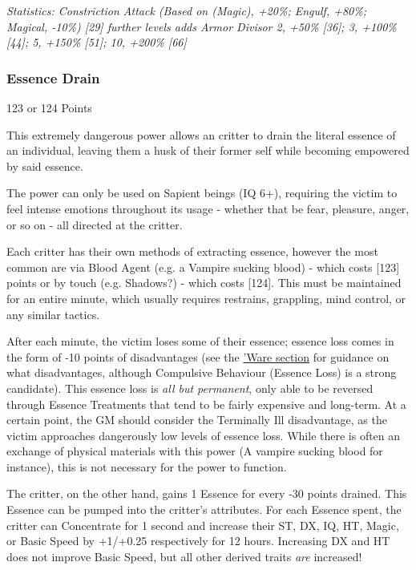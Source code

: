 \begin{multicols*}{3}
	\textcolor{OliveGreen}{\textit{Statistics: Constriction Attack (Based on (Magic), +20\%; Engulf, +80\%; Magical, -10\%) [29] further levels adds Armor Divisor 2, +50\% [36]; 3, +100\% [44]; 5, +150\% [51]; 10, +200\% [66]}}
	
	
	\subsubsection{Essence Drain}\label{essence_drain}
	\begin{flushright}
		123 or 124 Points
	\end{flushright}
		
	This extremely dangerous power allows an critter to drain the literal essence of an individual, leaving them a husk of their former self while becoming empowered by said essence.
	
	The power can only be used on Sapient beings (IQ 6+), requiring the victim to feel intense emotions throughout its usage - whether that be fear, pleasure, anger, or so on - all directed at the critter.
	
	Each critter has their own methods of extracting essence, however the most common are via Blood Agent (e.g. a Vampire sucking blood) - which costs [123] points or by touch (e.g. Shadows?) - which costs [124]. This must be maintained for an entire minute, which usually requires restrains, grappling, mind control, or any similar tactics.
	
	After each minute, the victim loses some of their essence; essence loss comes in the form of -10 points of disadvantages (see the \hyperref[ware]{'Ware section} for guidance on what disadvantages, although Compulsive Behaviour (Essence Loss) is a strong candidate). This essence loss is \textit{all but permanent}, only able to be reversed through Essence Treatments that tend to be fairly expensive and long-term. At a certain point, the GM should consider the Terminally Ill disadvantage, as the victim approaches dangerously low levels of essence loss. While there is often an exchange of physical materials with this power (A vampire sucking blood for instance), this is not necessary for the power to function.
	
	The critter, on the other hand, gains 1 Essence for every -30 points drained. This Essence can be pumped into the critter's attributes. For each Essence spent, the critter can Concentrate for 1 second and increase their ST, DX, IQ, HT, Magic, or Basic Speed by +1/+0.25 respectively for 12 hours. Increasing DX and HT does not improve Basic Speed, but all other derived traits \textit{are} increased!
	

\end{multicols*}

